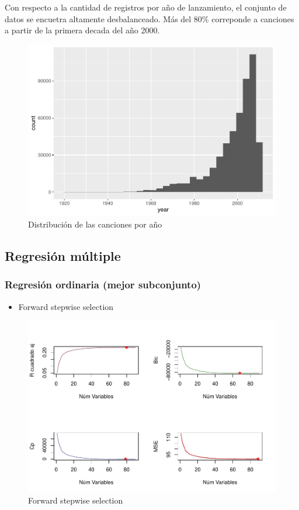 \documentclass[conference,final,]{IEEEtran}
\providecommand{\tightlist}{%
  \setlength{\itemsep}{0pt}\setlength{\parskip}{0pt}}
\begin{document}
Con respecto a la cantidad de registros por año de lanzamiento, el
conjunto de datos se encuetra altamente desbalanceado. Más del 80\%
correponde a canciones a partir de la primera decada del año 2000.

\begin{figure}[H]

{\centering \includegraphics[width=0.6\linewidth]{YearPrediction_Reporte_files/figure-latex/unnamed-chunk-1-1} 

}

\caption{Distribución de las canciones por año}\label{fig:unnamed-chunk-1}
\end{figure}

\hypertarget{regresion-multiple}{%
\subsection{Regresión múltiple}\label{regresion-multiple}}

\hypertarget{regresion-ordinaria-mejor-subconjunto}{%
\subsubsection{Regresión ordinaria (mejor
subconjunto)}\label{regresion-ordinaria-mejor-subconjunto}}

\begin{itemize}
\tightlist
\item
  Forward stepwise selection
\end{itemize}

\begin{figure}[H]

{\centering \includegraphics[width=0.6\linewidth]{YearPrediction_Reporte_files/figure-latex/unnamed-chunk-5-1} 

}

\caption{Forward stepwise selection}\label{fig:unnamed-chunk-5}
\end{figure}
\end{document}
